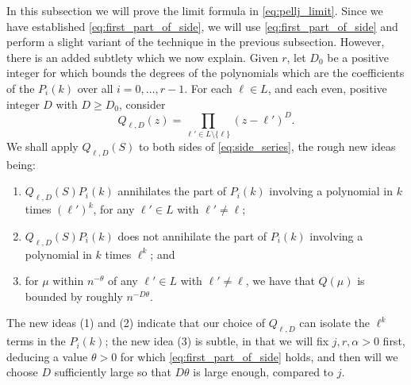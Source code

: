 \documentclass{memo-l}
\theoremstyle{plain}
\theoremstyle{definition}
\numberwithin{section}{chapter}
\numberwithin{equation}{chapter}
\theoremstyle{plain}
\theoremstyle{definition}
\begin{document}
In this subsection we will prove the limit formula in \eqref{eq:pellj_limit}.
Since we have established \eqref{eq:first_part_of_side}, we will use
\eqref{eq:first_part_of_side} and perform a slight variant of the technique
in the previous subsection.  However, there is an added subtlety which we now
explain.  Given \( r \), let \( D_0 \) be a positive integer for which
bounds the degrees of the polynomials which are the coefficients of the \(
P_i(k) \) over all \( i=0,\ldots,r-1 \).  For each \( \ell\in L \), and
each even, positive integer \( D \) with \( D\geq D_0 \), consider
\begin{equation}\label{eq:giveQellD} Q_{\ell,D}(z) = \prod_{\ell'\in
L\setminus\{\ell\}} (z-\ell')^D.  \end{equation} We shall apply \(
Q_{\ell,D}(S) \) to both sides of \eqref{eq:side_series}, the rough new
ideas being: \begin{enumerate} \item \( Q_{\ell,D}(S)P_i(k) \) annihilates
the part of \( P_i(k) \) involving a polynomial in \( k \) times \(
(\ell')^k \), for any \( \ell'\in L \) with \( \ell'\ne\ell \); \item \(
Q_{\ell,D}(S)P_i(k) \) does not annihilate the  part of \( P_i(k) \)
involving a polynomial in \( k \) times \( \ell^k \); and \item for \( \mu
\) within \( n^{-\theta} \) of any \( \ell'\in L \) with \( \ell'\ne\ell
\), we have that \( Q(\mu) \) is bounded by roughly \( n^{-D\theta} \).
\end{enumerate} The new ideas (1) and (2) indicate that our choice of \(
Q_{\ell,D} \) can isolate the \( \ell^k \) terms in the \( P_i(k) \); the
new idea (3) is subtle, in that we will fix \( j,r,\alpha>0 \) first,
deducing a value \( \theta>0 \) for which \eqref{eq:first_part_of_side}
holds, and then will we choose \( D \) sufficiently large so that \(
D\theta \) is large enough, compared to \( j \).
\end{document}
